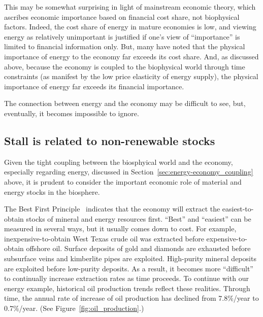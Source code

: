This may be somewhat surprising in light of mainstream economic theory, 
which ascribes economic importance 
based on financial cost share, 
not biophysical factors. 
Indeed, the cost share of energy in mature economies is low, 
and viewing energy as relatively unimportant is justified if
one's view of ``importance'' is limited to financial information only.
But, many have noted that the physical importance of energy to the economy 
far exceeds its cost share.\cite{Ayres:2013aa}
And, as discussed above, because the economy is coupled 
to the biophysical world through time constraints (as manifest 
by the low price elasticity of energy supply), 
the physical importance of energy far exceeds its financial importance.

The connection between energy and the economy may be difficult to see, 
but, eventually, it becomes impossible to ignore.


\subsection{Stall is related to non-renewable stocks}%
\label{sec:stall_non-renewable_stocks}

Given the tight coupling between the biosphyical world and the economy,
especially regarding energy,
discussed in Section~\ref{sec:energy-economy_coupling} above,
it is prudent to consider the important economic role of
material and energy stocks in the biosphere.

The Best First Principle~\cite{Cleveland:2008aa}
indicates that the economy will extract the easiest-to-obtain 
stocks of mineral and energy resources first.
``Best'' and ``easiest'' can be measured in several ways, 
but it usually comes down to cost.
For example, inexpensive-to-obtain West Texas crude oil was extracted
before expensive-to-obtain offshore oil. 
Surface deposits of gold and diamonds are exhausted before subsurface
veins and kimberlite pipes are exploited.
High-purity mineral deposits are exploited before low-purity deposits.
As a result, it becomes more ``difficult'' to continually increase
extraction rates as time proceeds.
To continue with our energy example,
historical oil production trends reflect these realities.
Through time, the annual rate of increase of oil production
has declined from 7.8\%/year to 0.7\%/year.
(See Figure~\ref{fig:oil_production}.)


